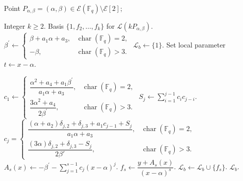 \documentclass[sn-mathphys-num]{sn-jnl_modified}
\begin{document}
\begin{appendices}
\begin{algorithm}[ht!]
\begin{algorithmic}[1]
Point $P_{\alpha, \beta} = (\alpha, \beta) \in \mathcal{E}(\mathbb{F}_{q})\setminus \mathcal{E}[2]$;

Integer $k \geq 2$.
\Ensure Basis $\{1, f_2, \dots, f_k\}$ for $\mathscr{L}(kP_{\alpha, \beta})$.
    \State $\beta^\prime \gets \begin{cases} 
        \beta + a_1\alpha + a_3,  & \operatorname{char}(\mathbb{F}_q) = 2,\\
        -\beta, & \operatorname{char}(\mathbb{F}_q) > 3.
    \end{cases}$
\State $\mathscr{L}_b \gets \{1\}$. 
\State Set local parameter $t \gets x - \alpha$.

\State $c_1 \gets \left\{
\begin{array}{cl}
        \dfrac{\alpha^2 + a_4 + a_1\beta^\prime}{a_1\alpha + a_3}, & \operatorname{char}(\mathbb{F}_q) = 2,
        \\[2.5ex]
        \dfrac{3\alpha^2 + a_4}{2\beta^\prime}, & \operatorname{char}(\mathbb{F}_q) > 3.
    \end{array}\right.
   $
     
        \State $S_j \gets \sum\limits_{i=1}^{j-1} c_i c_{j-i}$.
        \State $c_j = \left\{
\begin{array}{cl}
            \dfrac{(\alpha + a_2)\delta_{j,2} + \delta_{j,3} + a_1c_{j-1} + S_j}{a_1\alpha + a_3}, & \operatorname{char}(\mathbb{F}_q) = 2, \\[2ex]
        \dfrac{(3\alpha)\delta_{j,2} + \delta_{j,3} - S_j}{2\beta'}, & \operatorname{char}(\mathbb{F}_q) > 3.
\end{array}\right.$
    \EndFor 
    \State $A_s(x) \gets -\beta^\prime - \sum\limits_{j=1}^{s-1} c_j (x - \alpha)^j$.
    \State $f_s \gets \dfrac{y + A_s(x)}{(x - \alpha)^s}$.
    \State $\mathscr{L}_b \gets \mathscr{L}_b \cup \{f_s\}$.
\EndFor
\State \Return $\mathscr{L}_b$.
\end{algorithmic}
\end{algorithm}

\end{appendices}
	
\end{document}
